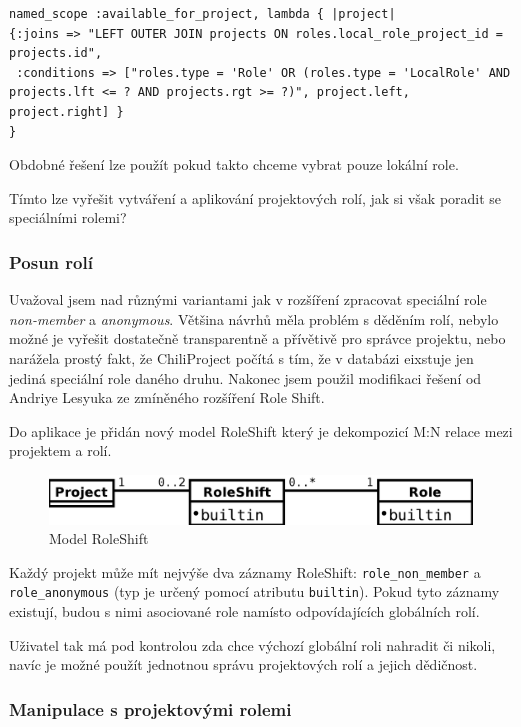 \documentclass[thesis=B,czech]{FITthesis}[2012/05/02]
\begin{document}
\begin{lstlisting}
named_scope :available_for_project, lambda { |project|
{:joins => "LEFT OUTER JOIN projects ON roles.local_role_project_id = projects.id",
 :conditions => ["roles.type = 'Role' OR (roles.type = 'LocalRole' AND projects.lft <= ? AND projects.rgt >= ?)", project.left, project.right] }
}
\end{lstlisting}
Obdobné řešení lze použít pokud takto chceme vybrat pouze lokální role.

Tímto lze vyřešit vytváření a aplikování projektových rolí, jak si však
poradit se speciálními rolemi?

\subsubsection{Posun rolí}

Uvažoval jsem nad různými variantami jak v rozšíření zpracovat speciální
role \emph{non-member} a \emph{anonymous}. Většina návrhů měla problém s
děděním rolí, nebylo možné je vyřešit dostatečně transparentně a
přívětivě pro správce projektu, nebo narážela prostý fakt, že
ChiliProject počítá s tím, že v databázi eixstuje jen jediná speciální
role daného druhu. Nakonec jsem použil modifikaci řešení od Andriye
Lesyuka ze zmíněného rozšíření Role Shift.

Do aplikace je přidán nový model RoleShift který je dekompozicí M:N
relace mezi projektem a rolí.

\begin{figure}[htbp]
\centering
\includegraphics[width=1\textwidth]{role-er2.pdf}
\caption{Model RoleShift}
\end{figure}

Každý projekt může mít nejvýše dva záznamy RoleShift:
\lstinline!role_non_member! a \lstinline!role_anonymous! (typ je určený
pomocí atributu \lstinline!builtin!). Pokud tyto záznamy existují, budou
s nimi asociované role namísto odpovídajících globálních rolí.

Uživatel tak má pod kontrolou zda chce výchozí globální roli nahradit či
nikoli, navíc je možné použít jednotnou správu projektových rolí a
jejich dědičnost.

\subsubsection{Manipulace s projektovými rolemi}
\end{document}
